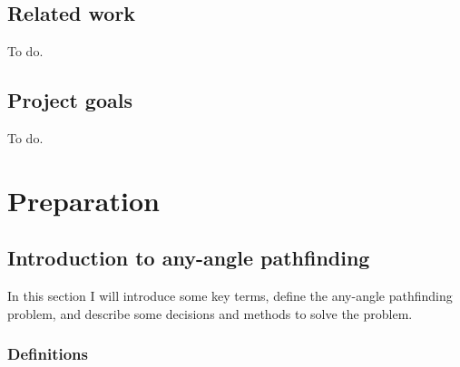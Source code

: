 \documentclass[12pt,twoside,notitlepage]{report}
\begin{document}
\section{Related work}

To do.

\section {Project goals}

To do.

\cleardoublepage


\chapter{Preparation} 

\section{Introduction to any-angle pathfinding}

In this section I will introduce some key terms, define the any-angle pathfinding problem, and describe some decisions and methods to solve the problem.

\subsection{Definitions}
\end{document}

